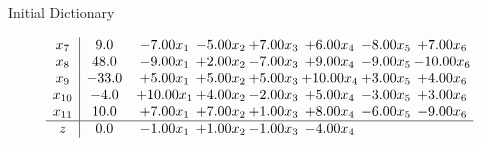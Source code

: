 \documentclass[8pt]{article}
\begin{document}
Initial Dictionary 

\[\begin{array}{c| c c@{\hskip 2pt} c@{\hskip 2pt} c@{\hskip 2pt} c@{\hskip 2pt} c@{\hskip 2pt} c@{\hskip 2pt} }
 x_{7}   &  9.0 & -7.00 x_{1} & -5.00 x_{2} & +  7.00 x_{3} & +  6.00 x_{4} & -8.00 x_{5} & +  7.00 x_{6}\\
 x_{8}   &  48.0 & -9.00 x_{1} & +  2.00 x_{2} & -7.00 x_{3} & +  9.00 x_{4} & -9.00 x_{5} & -10.00 x_{6}\\
 x_{9}   &  -33.0 & +  5.00 x_{1} & +  5.00 x_{2} & +  5.00 x_{3} & + 10.00 x_{4} & +  3.00 x_{5} & +  4.00 x_{6}\\
 x_{10}   &  -4.0 & + 10.00 x_{1} & +  4.00 x_{2} & -2.00 x_{3} & +  5.00 x_{4} & -3.00 x_{5} & +  3.00 x_{6}\\
 x_{11}   &  10.0 & +  7.00 x_{1} & +  7.00 x_{2} & +  1.00 x_{3} & +  8.00 x_{4} & -6.00 x_{5} & -9.00 x_{6}\\
\hline
z    &  0.0 & -1.00 x_{1} & +  1.00 x_{2} & -1.00 x_{3} & -4.00 x_{4} &    &   \\
\end{array}\]
\end{document}
